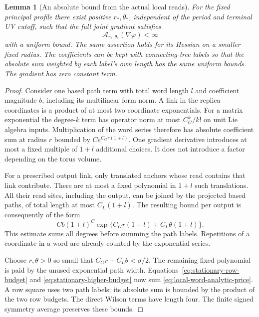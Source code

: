 \documentclass[11pt,reqno]{amsart}
\numberwithin{equation}{section}
\newtheorem{lemma}[theorem]{Lemma}
\theoremstyle{definition}
\theoremstyle{remark}
\begin{document}
\begin{lemma}[An absolute bound from the actual local reads]
\label{lem:local-path-majorant}
For the fixed principal profile there exist positive
\(r_*,\theta_*\), independent of the period and terminal
UV cutoff, such that the full joint gradient satisfies
\[
                   \mathcal A_{r_*,\theta_*}
                                   (\nabla\varphi)<\infty
\]
with a uniform bound. The same assertion holds for
its Hessian on a smaller fixed radius.
The coefficients can be kept with connecting-tree
labels so that the absolute sum weighted by each
label's own length has the same uniform bounds.
The gradient has zero constant term.
\end{lemma}
\begin{proof}
Consider one based path term with total word length
\(l\) and coefficient magnitude \(b\), including its
multilinear form norm. A link in the replica coordinates
is a product of at most two coordinate exponentials.
For a matrix exponential the degree-\(k\) term has
operator norm at most \(C_G^k/k!\) on unit Lie algebra
inputs. Multiplication of the word series therefore
has absolute coefficient sum at radius \(r\) bounded
by \(C e^{C_G r(1+l)}\).
One gradient derivative introduces at most a fixed
multiple of \(1+l\) additional choices. It does not
introduce a factor depending on the torus volume.

For a prescribed output link, only translated anchors
whose read contains that link contribute.
There are at most a fixed polynomial in \(1+l\)
such translations. All their read sites, including
the output, can be joined by the projected based
paths, of total length at most \(C_L(1+l)\).
The resulting bound per output is consequently of
the form
\begin{equation}
       Cb(1+l)^C
           \exp\{C_G r(1+l)+C_L\theta(1+l)\}.
 \label{eq:local-word-analytic-price}
\end{equation}
This estimate sums all degrees before summing the
path labels. Repetitions of a coordinate in a word
are already counted by the exponential series.

Choose \(r,\theta>0\) so small that
\(C_G r+C_L\theta<\sigma/2\).
The remaining fixed polynomial is paid by the
unused exponential path width.
Equations~\eqref{eq:stationary-row-budget} and
\eqref{eq:stationary-higher-budget} now sum
\eqref{eq:local-word-analytic-price}.
A row square uses two path labels; its absolute
sum is bounded by the product of the two row
budgets. The direct Wilson terms have length four.
The finite signed symmetry average preserves
these bounds.


\end{proof}
\end{document}
